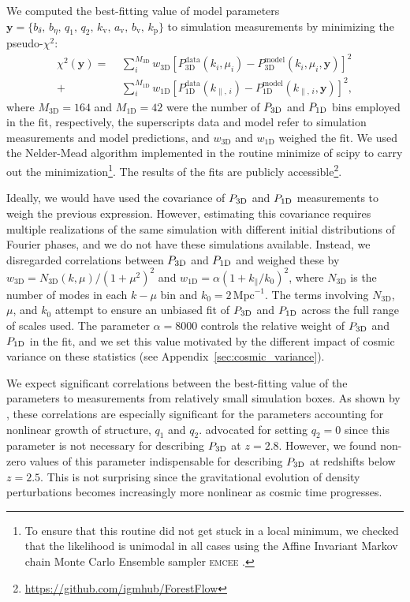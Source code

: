 \documentclass[longauth]{aa}
\newcommand{\poned}{\ensuremath{P_{\rm 1D}}\xspace}
\newcommand{\pthreed}{\ensuremath{P_{\rm 3D}}\xspace}
\newcommand{\iMpc}{\ensuremath{\,\mathrm{Mpc}^{-1}}}
\begin{document}
We computed the best-fitting value of model parameters $\mathbf{y}=\{b_\delta,\, b_\eta,\, q_1,\, q_2,\, k_\mathrm{v},\, a_\mathrm{v},\, b_\mathrm{v}, \, k_\mathrm{p}\}$ to simulation measurements by minimizing the pseudo-$\chi^2$:
%
\begin{align}
    \label{eq:chi2}
    \chi^2(\mathbf{y}) =& \,\,\sum_{i}^{M_\mathrm{3D}} w_\mathrm{3D}\left[P_\mathrm{3D}^\mathrm{data}(k_i, \mu_i) - P_\mathrm{3D}^\mathrm{model}(k_i, \mu_i, \mathbf{y})\right]^2 \nonumber\\ 
    +&\,\, \sum_{i}^{M_\mathrm{1D}} w_\mathrm{1D} 
    \left[P_\mathrm{1D}^\mathrm{data}(k_{\parallel,\,i}) - P_\mathrm{1D}^\mathrm{model}(k_{\parallel,\,i}, \mathbf{y})\right]^2,
\end{align}
%
where $M_\mathrm{3D}=164$ and $M_\mathrm{1D}=42$ were the number of \pthreed and \poned bins employed in the fit, respectively, the superscripts data and model refer to simulation measurements and model predictions, and $w_\mathrm{3D}$ and $w_\mathrm{1D}$ weighed the fit. We used the Nelder-Mead algorithm implemented in the routine {\sc minimize} of {\sc scipy} \citep{virtanen2020_SciPyFundamentalalgorithms} to carry out the minimization\footnote{To ensure that this routine did not get stuck in a local minimum, we checked that the likelihood is unimodal in all cases using the Affine Invariant Markov chain Monte Carlo Ensemble sampler \textsc{emcee} \citep{foremanmackey13}.}. The results of the fits are publicly accessible\footnote{\url{https://github.com/igmhub/ForestFlow}}.

Ideally, we would have used the covariance of \pthreed and \poned measurements to weigh the previous expression. However, estimating this covariance requires multiple realizations of the same simulation with different initial distributions of Fourier phases, and we do not have these simulations available. Instead, we disregarded correlations between \pthreed and \poned and weighed these by $w_\mathrm{3D}= N_\mathrm{3D}(k, \mu)/(1+\mu^2)^2$ and $w_\mathrm{1D}=\alpha (1+k_{\parallel}/k_0)^2$, where $N_\mathrm{3D}$ is the number of modes in each $k-\mu$ bin and $k_0=2\iMpc$. The terms involving $N_\mathrm{3D}$, $\mu$, and $k_0$ attempt to ensure an unbiased fit of \pthreed and \poned across the full range of scales used. The parameter $\alpha=8000$ controls the relative weight of \pthreed and \poned in the fit, and we set this value motivated by the different impact of cosmic variance on these statistics (see Appendix~\ref{sec:cosmic_variance}).

We expect significant correlations between the best-fitting value of the parameters to measurements from relatively small simulation boxes. As shown by \citet{arinyo-i-prats2015NonlinearPowerSpectrum}, these correlations are especially significant for the parameters accounting for nonlinear growth of structure, $q_1$ and $q_2$. \citet{givans2022NonlinearitiesLymanAlpha} advocated for setting $q_2=0$ since this parameter is not necessary for describing \pthreed at $z=2.8$. However, we found non-zero values of this parameter indispensable for describing \pthreed at redshifts below $z=2.5$. This is not surprising since the gravitational evolution of density perturbations becomes increasingly more nonlinear as cosmic time progresses.
\end{document}
